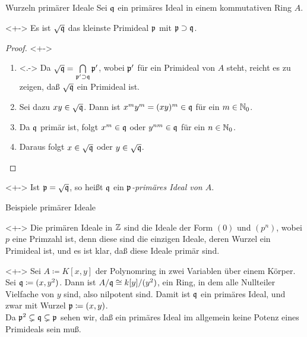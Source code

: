 \begin{frame}{Wurzeln primärer Ideale}
	Sei \(\mathfrak{q}\) ein primäres Ideal in einem kommutativen Ring \(A\). 
	\begin{proposition}<+->
		Es ist \(\sqrt{\mathfrak{q}}\) das kleinste Primideal \(\mathfrak{p}\) mit \(\mathfrak{p} \supset \mathfrak{q}\).
	\end{proposition}
	\begin{proof}<+->
		\begin{enumerate}[<+->]
		\item<.->
			Da \(\sqrt{\mathfrak{q}} = \bigcap\limits_{\mathfrak{p}' \supset \mathfrak{q}} \mathfrak{p}'\), wobei \(\mathfrak{p}'\) für ein
			Primideal von \(A\) steht, reicht es zu zeigen, daß \(\sqrt{\mathfrak{q}}\) ein Primideal ist.
		\item
			Sei dazu \(x y \in \sqrt{\mathfrak{q}}\). Dann ist \(x^m y^m = (x y)^m \in \mathfrak{q}\) für ein \(m \in \mathbb N_0\).
		\item
			Da \(\mathfrak{q}\) primär ist, folgt \(x^m \in \mathfrak{q}\) oder \(y^{nm} \in \mathfrak{q}\) für ein \(n \in \mathbb N_0\).
		\item
			Daraus folgt \(x \in \sqrt{\mathfrak{q}}\) oder \(y \in \sqrt{\mathfrak{q}}\).
			\qedhere
		\end{enumerate}
	\end{proof}
	\begin{definition}<+->
		Ist \(\mathfrak{p} = \sqrt{\mathfrak{q}}\), so heißt \(\mathfrak{q}\) ein \emph{\(\mathfrak{p}\)-primäres Ideal von \(A\)}.
	\end{definition}
\end{frame}

\begin{frame}{Beispiele primärer Ideale}
	\begin{example}<+->
		Die primären Ideale in \(\mathbb Z\) sind die Ideale der Form \((0)\) und \((p^n)\), wobei \(p\) eine Primzahl ist, denn
		diese sind die einzigen Ideale, deren Wurzel ein Primideal ist, und es ist klar, daß diese Ideale primär sind.
	\end{example}
	\begin{example}<+->
		Sei \(A \coloneqq K[x, y]\) der Polynomring in zwei Variablen über einem Körper. Sei \(\mathfrak{q} \coloneqq (x, y^2)\). Dann ist
		\(A/\mathfrak{q} \cong k[y]/(y^2)\), ein Ring, in dem alle Nullteiler Vielfache von \(y\) sind, also nilpotent sind. Damit ist
		\(\mathfrak{q}\) ein primäres Ideal, und zwar mit Wurzel \(\mathfrak{p} \coloneqq (x, y)\).
		\\
		Da \(\mathfrak{p}^2 \subsetneq \mathfrak{q} \subsetneq \mathfrak{p}\) sehen wir, daß ein primäres Ideal im allgemein keine Potenz
		eines Primideals sein muß.
	\end{example}
\end{frame}

